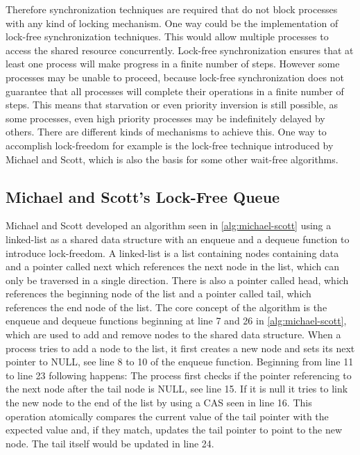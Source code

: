 Therefore synchronization techniques are required that do not block processes with any kind of locking mechanism. One way could be the implementation of lock-free synchronization techniques. This would allow multiple processes to access the shared resource concurrently. Lock-free synchronization ensures that at least one process will make progress in a finite number of steps. However some processes may be unable to proceed, because lock-free synchronization does not guarantee that all processes will complete their operations in a finite number of steps. This means that starvation or even priority inversion is still possible, as some processes, even high priority processes may be indefinitely delayed by others. There are different kinds of mechanisms to achieve this. One way to accomplish lock-freedom for example is the lock-free technique introduced by Michael and Scott, which is also the basis for some other wait-free algorithms.

\subsection{Michael and Scott's Lock-Free Queue}\label{subsec:michael-scott}

Michael and Scott developed an algorithm seen in \cref{alg:michael-scott} using a linked-list as a shared data structure with an enqueue and a dequeue function to introduce lock-freedom. A linked-list is a list containing nodes containing data and a pointer called next which references the next node in the list, which can only be traversed in a single direction. There is also a pointer called head, which references the beginning node of the list and a pointer called tail, which references the end node of the list. The core concept of the algorithm is the enqueue and dequeue functions beginning at line 7 and 26 in \cref{alg:michael-scott}, which are used to add and remove nodes to the shared data structure. When a process tries to add a node to the list, it first creates a new node and sets its next pointer to NULL, see line 8 to 10 of the enqueue function. Beginning from line 11 to line 23 following happens: The process first checks if the pointer referencing to the next node after the tail node is NULL, see line 15. If it is null it tries to link the new node to the end of the list by using a \ac{CAS} seen in line 16. This operation atomically compares the current value of the tail pointer with the expected value and, if they match, updates the tail pointer to point to the new node. The tail itself would be updated in line 24.  \cite{MichaelScottQueue}

